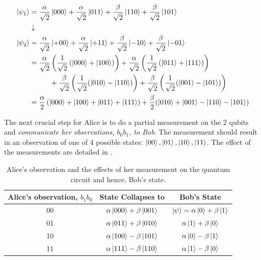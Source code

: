 \begin{equation}
    \begin{aligned}
        \ket{\psi_1} &= \frac{\alpha}{\sqrt{2}}\ket{000} + \frac{\alpha}{\sqrt{2}}\ket{011} + \frac{\beta}{\sqrt{2}}\ket{110} + \frac{\beta}{\sqrt{2}}\ket{101}\\
        &\downarrow\\
        \ket{\psi_2}&= \frac{\alpha}{\sqrt{2}}\ket{+00} + \frac{\alpha}{\sqrt{2}}\ket{+11} + \frac{\beta}{\sqrt{2}}\ket{-10} + \frac{\beta}{\sqrt{2}}\ket{-01}\\
        &=\frac{\alpha}{\sqrt{2}} \left(\frac{1}{\sqrt{2}}\left(\ket{000} + \ket{100}\right)\right) + \frac{\alpha}{\sqrt{2}} \left(\frac{1}{\sqrt{2}}\left(\ket{011} + \ket{111}\right)\right) \\
        &\hspace{1cm}+ \frac{\beta}{\sqrt{2}}\left(\frac{1}{\sqrt{2}}(\ket{010} - \ket{1 10})\right) + \frac{\beta}{\sqrt{2}}\left(\frac{1}{\sqrt{2}}(\ket{001} - \ket{101})\right)\\
        &=\frac{\alpha}{2}\left(\ket{000} + \ket{100} + \ket{011} + \ket{111}\right) + \frac{\beta}{2}(\ket{010} + \ket{001} - \ket{110} - \ket{101})
    \end{aligned}
\end{equation}

The next crucial step for Alice is to do a partial measurement on the 2 qubits and \textit{communicate her observations, \(b_0b_1\), to Bob}. The measurement should result in an observation of one of 4 possible states: \(\ket{00}, \ket{01}, \ket{10}, \ket{11}\). The effect of the measurements are detailed in .


\begin{table}[!ht]
    \centering
    \begin{tabular}{|c|c|c|}\hline
         Alice's observation, \(b_1b_0\) & State Collapses to & Bob's State \\\hline
         00 & \(\alpha \ket{000} + \beta\ket{001}\) & \(\ket{\psi}=\alpha\ket{0} + \beta\ket{1}\)\\
         01 & \(\alpha \ket{011} + \beta\ket{010}\) & \(\alpha\ket{1} + \beta\ket{0}\)\\
         10 & \(\alpha\ket{100} - \beta\ket{101}\) & \(\alpha \ket{0} - \beta\ket{1}\) \\
         11& \(\alpha \ket{111} - \beta\ket{110}\) & \(\alpha\ket{1} - \beta\ket{0}\)\\\hline
    \end{tabular}
    \caption{Alice's observation and the effects of her measurement on the quantum circuit and hence, Bob's state.}
    \label{tab:epr_quantum_teleport_aft_measurement}
\end{table}

